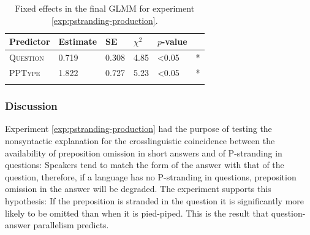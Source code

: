 \begin{table}[t]
\begin{tabular}{l l l l l l}
\lsptoprule
Predictor & Estimate & SE & $\chi^2$ &  $p$-value &  \\   
\midrule
\textsc{Question} & 0.719 &  0.308 & 4.85 & \textless 0.05 & * \\
\textsc{PPType} & 1.822 &     0.727 &   5.23 &  \textless 0.05 & *\\
\lspbottomrule
\end{tabular}
\caption{Fixed effects in the final GLMM for experiment \ref{exp:pstranding-production}.\label{tab:pstranding-production-estimates}}
\end{table}

\subsubsection{Discussion}
Experiment \ref{exp:pstranding-production} had the purpose of testing the nonsyntactic explanation for the crosslinguistic coincidence between the availability of preposition omission in short answers and of P-stranding in questions: Speakers tend to match the form of the answer with that of the question, therefore, if a language has no P-stranding in questions, preposition omission in the answer will be degraded. The experiment supports this hypothesis: If the preposition is stranded in the question it is significantly more likely to be omitted than when it is pied-piped. This is the result that question-answer parallelism predicts.

